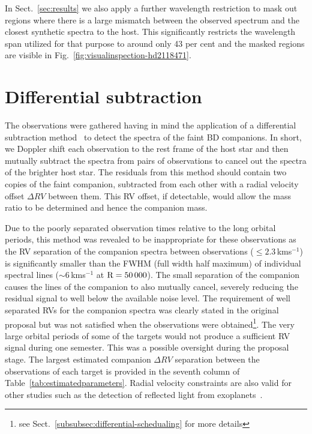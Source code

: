 \documentclass[fleqn,usenatbib]{mnras}
\newcommand{\kmps}{\,kms\(^{-1}\)}	%
\begin{document}
In Sect.~\ref{sec:results} we also apply a further wavelength restriction to mask out regions where there is a large mismatch between the observed spectrum and the closest synthetic spectra to the host. This significantly restricts the wavelength span utilized for that purpose to around only 43 per cent and the masked regions are visible in Fig.~\ref{fig:visualinspection-hd2118471}.


\section{Differential subtraction}
\label{sec:spec_diff}

The observations were gathered having in mind the application of a differential subtraction method~\citep[e.g.][]{ferluga_separating_1997, kostogryz_spectral_2013} to detect the spectra of the faint BD companions. In short, we Doppler shift each observation to the rest frame of the host star and then mutually subtract the spectra from pairs of observations to cancel out the spectra of the brighter host star. The residuals from this method should contain two copies of the faint companion, subtracted from each other with a radial velocity offset \(\Delta RV\) between them. This RV offset, if detectable, would allow the mass ratio to be determined and hence the companion mass.

Due to the poorly separated observation times relative to the long orbital periods, this method was revealed to be inappropriate for these observations as the RV separation of the companion spectra between observations (\(\le 2.3\)\kmps{}) is significantly smaller than the FWHM (full width half maximum) of individual spectral lines (\(\sim\)6\kmps{} at \(\rm R=50\,000\)).  The small separation of the companion causes the lines of the companion to also mutually cancel, severely reducing the residual signal to well below the available noise level. The requirement of well separated RVs for the companion spectra was clearly stated in the original proposal but was not satisfied when the observations were obtained\footnote{see Sect.~\ref{subsubsec:differential-schedualing} for more details}. {The very large orbital periods of some of the targets would not produce a sufficient RV signal during one semester. This was a possible oversight during the proposal stage.} The largest estimated companion \(\Delta RV\) separation between the observations of each target is provided in the seventh column of Table~\ref{tab:estimatedparameters}. Radial velocity constraints are also valid for other studies such as the detection of reflected light from exoplanets~\citep{martins_evidence_2015}.
\end{document}
